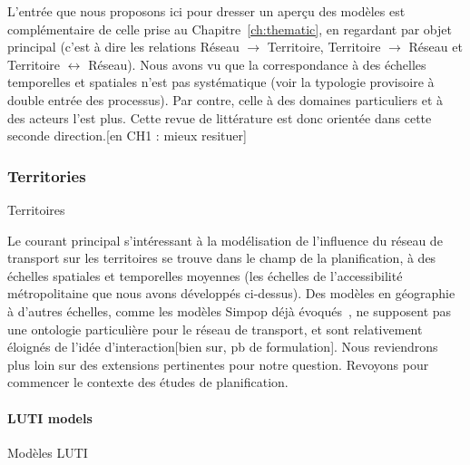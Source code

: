L'entrée que nous proposons ici pour dresser un aperçu des modèles est complémentaire de celle prise au Chapitre~\ref{ch:thematic}, en regardant par objet principal (c'est à dire les relations Réseau $\rightarrow$ Territoire, Territoire $\rightarrow$ Réseau et Territoire $\leftrightarrow$ Réseau). Nous avons vu que la correspondance à des échelles temporelles et spatiales n'est pas systématique (voir la typologie provisoire à double entrée des processus). Par contre, celle à des domaines particuliers et à des acteurs l'est plus. Cette revue de littérature est donc orientée dans cette seconde direction.[en CH1 : mieux resituer]



\subsubsection{Territories}{Territoires}


Le courant principal s'intéressant à la modélisation de l'influence du réseau de transport sur les territoires se trouve dans le champ de la planification, à des échelles spatiales et temporelles moyennes (les échelles de l'accessibilité métropolitaine que nous avons développés ci-dessus). Des modèles en géographie à d'autres échelles, comme les modèles Simpop déjà évoqués~\cite{pumain2012multi}, ne supposent pas une ontologie particulière pour le réseau de transport, et sont relativement éloignés de l'idée d'interaction[bien sur, pb de formulation]. Nous reviendrons plus loin sur des extensions pertinentes pour notre question. Revoyons pour commencer le contexte des études de planification.


\paragraph{LUTI models}{Modèles LUTI}

